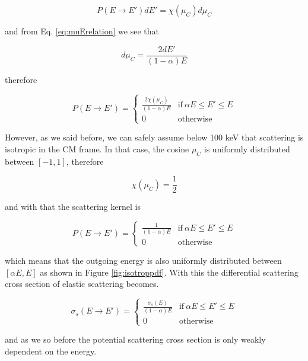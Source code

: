 $$P(E\rightarrow E')dE'=\chi(\mu_C)d\mu_C$$

\noindent and from  Eq. \eqref{eq:muErelation} we see that

$$d\mu_C=\frac{2dE'}{(1-\alpha)E}$$

\noindent therefore

\begin{equation}
    P(E\rightarrow E') = 
    \begin{cases}
      \frac{2\chi(\mu_C)}{(1-\alpha)E} & \text{if} \: \alpha E \leq E' \leq E \\
      0 & \text{otherwise}
    \end{cases}
\end{equation}

However, as we said before, we can safely assume below 100 keV that scattering is isotropic in the CM frame. In that case, the cosine $\mu_C$ is uniformly distributed between $[-1,1]$, therefore

$$\chi(\mu_C)=\frac{1}{2}$$

\noindent and with that the scattering kernel is

\begin{equation}
    P(E\rightarrow E') = 
    \begin{cases}
      \frac{1}{(1-\alpha)E} & \text{if} \: \alpha E \leq E' \leq E \\
      0 & \text{otherwise}
    \end{cases}
\end{equation}

\noindent which means that the outgoing energy is also uniformly distributed between $[\alpha E, E]$ as shown in Figure \ref{fig:isotroppdf}. With this the differential scattering cross section of elastic scattering becomes.

\begin{equation}
    \sigma_s(E\rightarrow E') = 
    \begin{cases}
      \frac{\sigma_s(E)}{(1-\alpha)E} & \text{if} \: \alpha E \leq E' \leq E \\
      0 & \text{otherwise}
    \end{cases}
\end{equation}

\noindent and as we so before the potential scattering cross section is only weakly dependent on the energy.

